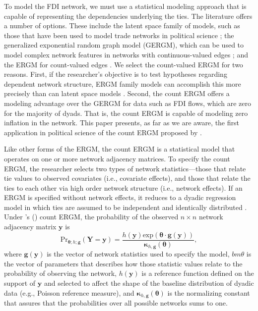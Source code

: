 \documentclass{article}
\newcommand\citeapos[1]{\citeauthor{#1}'s (\citeyear{#1})}
\begin{document}
To model the FDI network, we must use a statistical modeling approach that is capable of representing the dependencies underlying the ties. The literature offers a number of options. These include the latent space family of models, such as those that have been used to model trade networks in political science \citep{ward2007persistent,ward2013gravity}; the generalized exponential random graph model (GERGM), which can be used to model complex network features in networks with continuous-valued edges \citep{desmarais2012statistical,wilson2017stochastic}; and the ERGM for count-valued edges \citep{krivitsky2012exponential}. We select the count-valued ERGM for two reasons. First, if the researcher's objective is to test hypotheses regarding dependent network structure, ERGM family models can accomplish this more precisely than can latent space models \citep{cranmer2016navigating,cranmer2016critique,desmarais2017statistical}. Second, the count ERGM offers a modeling advantage over the GERGM for data such as FDI flows, which are zero for the majority of dyads. That is, the count ERGM is capable of modeling zero inflation in the network. This paper presents, as far as we are aware, the first application in political science of the count ERGM proposed by \cite{krivitsky2012exponential}.

Like other forms of the ERGM, the count ERGM is a statistical model that operates on one or more network adjacency matrices. To specify the count ERGM, the researcher selects two types of network statistics---those that relate tie values to observed covariates (i.e., covariate effects), and those that relate the ties to each other via high order network structure (i.e., network effects). If an ERGM is specified without network effects, it reduces to a dyadic regression model in which ties are assumed to be independent and identically distributed \cite{cranmer2011inferential}. Under \citeapos{krivitsky2012exponential} count ERGM, the probability of the observed $n \times n$ network adjacency matrix $\bm{y}$ is $$ \text{Pr}_{\bm{\theta};h;\bm{g}}( \bm{Y}=\bm{y} )=\frac{ h(\bm{y})\text{exp}( \bm{\theta} \cdot \bm{g} (\bm{y}) )}{\bm{\kappa}_{h,\bm{g}}(\bm{\theta})},$$ where $\bm{g}( \bm{y} )$ is the vector of network statistics used to specify the model, $bm{\theta}$ is the vector of parameters that describes how those statistic values relate to the probability of observing the network, $h(\bm{y})$ is a reference function defined on the support of $\bm{y}$ and selected to affect the shape of the baseline distribution of dyadic data (e.g., Poisson reference measure), and $\bm{\kappa}_{h,\bm{g}}(\bm{\theta})$ is the normalizing constant that assures that the probabilities over all possible networks sums to one. 
\end{document}
